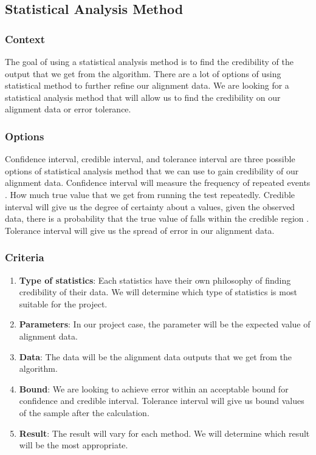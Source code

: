 
\subsection{Statistical Analysis Method}
\subsubsection{Context}
The goal of using a statistical analysis method is to find the credibility of the output that we get from the algorithm.
There are a lot of options of using statistical method to further refine our alignment data.
We are looking for a statistical analysis method that will allow us to find the credibility on our alignment data or error tolerance. \\

\subsubsection{Options}
Confidence interval, credible interval, and tolerance interval are three possible options of statistical analysis method that we can use to gain credibility of our alignment data.
Confidence interval will measure the frequency of repeated events \cite{stat}.
How much true value that we get from running the test repeatedly.
Credible interval will give us the degree of certainty about a values, given the observed data, there is a probability that the true value of falls within the credible region \cite{stat}.
Tolerance interval will give us the spread of error in our alignment data.\\

\subsubsection{Criteria}
\begin{enumerate}
	\item \textbf{Type of statistics}: Each statistics have their own philosophy of finding credibility of their data. We will determine which type of statistics is most suitable for the project. 
	\item \textbf{Parameters}: In our project case, the parameter will be the expected value of alignment data. 
	\item \textbf{Data}: The data will be the alignment data outputs that we get from the algorithm.  
	\item \textbf{Bound}: We are looking to achieve error within an acceptable bound for confidence and credible interval. Tolerance interval will give us bound values of the sample after the calculation. 
	\item \textbf{Result}: The result will vary for each method. We will determine which result will be the most appropriate.\\
\end{enumerate}

